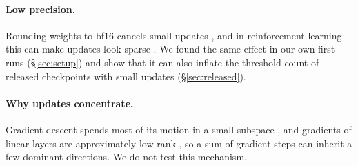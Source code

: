 \paragraph{Low precision.} Rounding weights to bf16 cancels small updates
\citep{zamirai2020bfloat16}, and in reinforcement learning this can make
updates look sparse \citep{zhu2025path}. We found the same effect in our own
first runs (\S\ref{sec:setup}) and show that it can also inflate the
threshold count of released checkpoints with small updates
(\S\ref{sec:released}).

\paragraph{Why updates concentrate.} Gradient descent spends most of its
motion in a small subspace \citep{gurari2018tiny}, and gradients of linear
layers are approximately low rank \citep{zhao2024galore}, so a sum of gradient
steps can inherit a few dominant directions. We do not test this mechanism.
